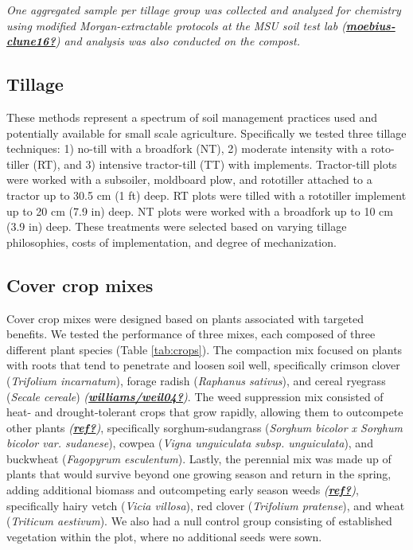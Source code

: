 \documentclass[
]{article}
\begin{document}
\emph{One aggregated sample per tillage group was collected and analyzed for chemistry using modified Morgan-extractable protocols at the MSU soil test lab (\protect\hyperlink{ref-moebius-clune16}{\textbf{moebius-clune16?}}) and analysis was also conducted on the compost.}

\hypertarget{tillage}{%
\subsection{Tillage}\label{tillage}}

These methods represent a spectrum of soil management practices used and potentially available for small scale agriculture.
Specifically we tested three tillage techniques:
1) no-till with a broadfork (NT),
2) moderate intensity with a roto-tiller (RT), and
3) intensive tractor-till (TT) with implements.
Tractor-till plots were worked with a subsoiler, moldboard plow, and rototiller attached to a tractor up to 30.5 cm (1 ft) deep.
RT plots were tilled with a rototiller implement up to 20 cm (7.9 in) deep.
NT plots were worked with a broadfork up to 10 cm (3.9 in) deep.
These treatments were selected based on varying tillage philosophies, costs of implementation, and degree of mechanization.

\hypertarget{cover-crop-mixes}{%
\subsection{Cover crop mixes}\label{cover-crop-mixes}}

Cover crop mixes were designed based on plants associated with targeted benefits.
We tested the performance of three mixes, each composed of three different plant species (Table \ref{tab:crops}).
The compaction mix focused on plants with roots that tend to penetrate and loosen soil well, specifically crimson clover (\emph{Trifolium incarnatum}), forage radish (\emph{Raphanus sativus}), and cereal ryegrass (\emph{Secale cereale}) \emph{(\protect\hyperlink{ref-williamsux2fweil04}{\textbf{williams/weil04?}})}.
The weed suppression mix consisted of heat- and drought-tolerant crops that grow rapidly, allowing them to outcompete other plants \emph{(\protect\hyperlink{ref-ref}{\textbf{ref?}})}, specifically sorghum-sudangrass (\emph{Sorghum bicolor x Sorghum bicolor var. sudanese}), cowpea (\emph{Vigna unguiculata subsp. unguiculata}), and buckwheat (\emph{Fagopyrum esculentum}).
Lastly, the perennial mix was made up of plants that would survive beyond one growing season and return in the spring, adding additional biomass and outcompeting early season weeds \emph{(\protect\hyperlink{ref-ref}{\textbf{ref?}})}, specifically hairy vetch (\emph{Vicia villosa}), red clover (\emph{Trifolium pratense}), and wheat (\emph{Triticum aestivum}).
We also had a null control group consisting of established vegetation within the plot, where no additional seeds were sown.
\end{document}

